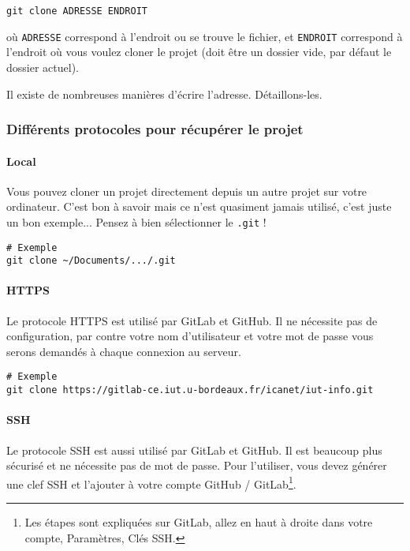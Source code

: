 \documentclass[10pt,a4paper]{article}
\begin{document}
\begin{verbatim}
git clone ADRESSE ENDROIT
\end{verbatim}

où {\tt ADRESSE} correspond à l'endroit ou se trouve le fichier, et {\tt ENDROIT} correspond à l'endroit où vous voulez cloner le projet (doit être un dossier vide, par défaut le dossier actuel).

Il existe de nombreuses manières d'écrire l’adresse. Détaillons-les.

\subsubsection[Différents protocoles]{Différents protocoles pour récupérer le projet}

\paragraph{Local} Vous pouvez cloner un projet directement depuis un autre projet sur votre ordinateur. C'est bon à savoir mais ce n'est quasiment jamais utilisé, c'est juste un bon exemple... Pensez à bien sélectionner le {\tt .git} !

\begin{verbatim}
# Exemple
git clone ~/Documents/.../.git
\end{verbatim}

\paragraph{HTTPS}

Le protocole HTTPS est utilisé par GitLab et GitHub. Il ne nécessite pas de configuration, par contre votre nom d'utilisateur et votre mot de passe vous serons demandés à chaque connexion au serveur.

\begin{verbatim}
# Exemple
git clone https://gitlab-ce.iut.u-bordeaux.fr/icanet/iut-info.git
\end{verbatim}

\paragraph{SSH}

Le protocole SSH est aussi utilisé par GitLab et GitHub. Il est beaucoup plus sécurisé et ne nécessite pas de mot de passe. Pour l'utiliser, vous devez générer une clef SSH et l'ajouter à votre compte GitHub / GitLab\footnote{Les étapes sont expliquées sur GitLab, allez en haut à droite dans votre compte, Paramètres, Clés SSH.}.
\end{document}
